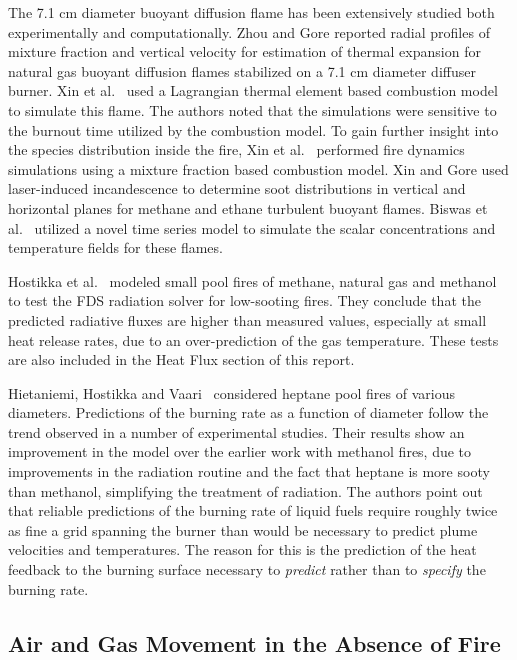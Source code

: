 The 7.1 cm diameter buoyant diffusion flame has been extensively studied both experimentally and computationally. Zhou and Gore \cite{Zhou:CS1998} reported radial profiles of mixture fraction and vertical velocity for estimation of thermal expansion for natural gas buoyant diffusion flames stabilized on a 7.1 cm diameter diffuser burner. Xin et al.~\cite{Xin:CSS2002} used a Lagrangian thermal element based combustion model to simulate this flame. The authors noted that the simulations were sensitive to the burnout time utilized by the combustion model. To gain further insight into the species distribution inside the fire, Xin et al.~\cite{Xin:CF2005} performed fire dynamics simulations using a mixture fraction based combustion model. Xin and Gore \cite{Xin:CS2005} used laser-induced incandescence to determine soot distributions in vertical and horizontal planes for methane and ethane turbulent buoyant flames. Biswas et al.~\cite{Biswas:CS2007} utilized a novel time series model to simulate the scalar concentrations and temperature fields for these flames.

Hostikka et al.~\cite{Hostikka:3} modeled small pool fires of methane, natural gas and methanol to test the FDS radiation solver for low-sooting fires. They conclude that the predicted radiative fluxes are higher than measured values, especially at small heat release rates, due to an over-prediction of the gas temperature. These tests are also included in the Heat Flux section of this report.

Hietaniemi, Hostikka and Vaari~\cite{Hietaniemi:1} considered heptane pool fires of various diameters. Predictions of the burning rate as a function of diameter follow the trend observed in a number of experimental studies. Their results show an improvement in the model over the earlier work with methanol fires, due to improvements in the radiation routine and the fact that heptane is more sooty than methanol, simplifying the treatment of radiation.  The authors point out that reliable predictions of the burning rate of liquid fuels require roughly twice as fine a grid spanning the burner than would be necessary to predict plume velocities and temperatures. The reason for this is the prediction of the heat feedback to the burning surface necessary to {\em predict} rather than to {\em specify} the burning rate.


\subsection{Air and Gas Movement in the Absence of Fire}

